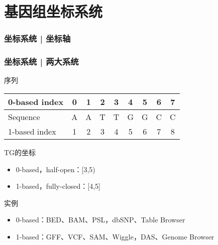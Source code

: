 \section{基因组坐标系统}
\begin{frame}
  \frametitle{坐标系统 | 坐标轴}
  \pause
  \pause
  \pause
\end{frame}

\begin{frame}
  \frametitle{坐标系统 | \alert{两大系统}}
  \begin{block}{序列}
  \begin{table}
    \centering
    \begin{tabular}{lcccccccc}
      \hline
      0-based index & 0 & 1 & 2 & 3 & 4 & 5 & 6 & 7\\
      \hline
      Sequence & A & A & T & T & G & G & C & C\\
      \hline
      1-based index & 1 & 2 & 3 & 4 & 5 & 6 & 7 & 8\\
      \hline
    \end{tabular}
  \end{table}
  \end{block}
  \pause
  \begin{block}{TG的坐标}
    \begin{itemize}
      \item 0-based，half-open：[3,5)
      \item 1-based，fully-closed：[4,5]
    \end{itemize}
  \end{block}
  \pause
  \begin{block}{实例}
    \begin{itemize}
      \item 0-based：BED、BAM、PSL，dbSNP、Table Browser
      \item 1-based：GFF、VCF、SAM、Wiggle，DAS、Genome Browser
    \end{itemize}
  \end{block}
\end{frame}

